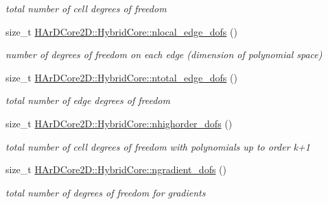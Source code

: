 \begin{DoxyCompactItemize}
\begin{DoxyCompactList}\small\item\em total number of cell degrees of freedom \end{DoxyCompactList}\item 
\mbox{\label{group__HybridCore_ga6a45e5ff09d21b18874e1446cd9de9bc}} 
size\+\_\+t \hyperlink{group__HybridCore_ga6a45e5ff09d21b18874e1446cd9de9bc}{H\+Ar\+D\+Core2\+D\+::\+Hybrid\+Core\+::nlocal\+\_\+edge\+\_\+dofs} ()
\begin{DoxyCompactList}\small\item\em number of degrees of freedom on each edge (dimension of polynomial space) \end{DoxyCompactList}\item 
\mbox{\label{group__HybridCore_ga49a703b6786215e5acf8bb59ecdbc9ea}} 
size\+\_\+t \hyperlink{group__HybridCore_ga49a703b6786215e5acf8bb59ecdbc9ea}{H\+Ar\+D\+Core2\+D\+::\+Hybrid\+Core\+::ntotal\+\_\+edge\+\_\+dofs} ()
\begin{DoxyCompactList}\small\item\em total number of edge degrees of freedom \end{DoxyCompactList}\item 
\mbox{\label{group__HybridCore_gaa7f78bc066429a18ad596d45a79d37bc}} 
size\+\_\+t \hyperlink{group__HybridCore_gaa7f78bc066429a18ad596d45a79d37bc}{H\+Ar\+D\+Core2\+D\+::\+Hybrid\+Core\+::nhighorder\+\_\+dofs} ()
\begin{DoxyCompactList}\small\item\em total number of cell degrees of freedom with polynomials up to order k+1 \end{DoxyCompactList}\item 
\mbox{\label{group__HybridCore_ga6f7c5ef5103bed8a3e0ecc18d592b1f9}} 
size\+\_\+t \hyperlink{group__HybridCore_ga6f7c5ef5103bed8a3e0ecc18d592b1f9}{H\+Ar\+D\+Core2\+D\+::\+Hybrid\+Core\+::ngradient\+\_\+dofs} ()
\begin{DoxyCompactList}\small\item\em total number of degrees of freedom for gradients \end{DoxyCompactList}\item 
\mbox{\label{group__HybridCore_gae6e771ab58f248db8f051d47de982cf5}} 

\end{DoxyCompactItemize}
